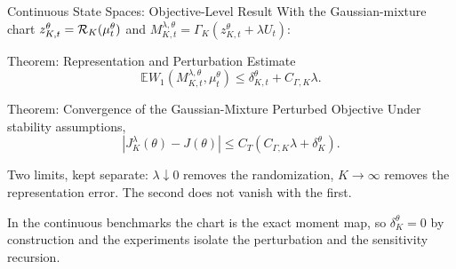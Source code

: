 \documentclass[9pt]{beamer}
\def\Rc{{\cal R}}
\def\E{{\mathbb E}}
\begin{document}
\begin{frame}{Continuous State Spaces: Objective-Level Result}
\small
With the Gaussian-mixture chart $z_{K,t}^\theta=\Rc_K(\mu_t^\theta)$ and $M_{K,t}^{\lambda,\theta}=\Gamma_K(z_{K,t}^\theta+\lambda U_t)$:

\vspace{0.2cm}
\begin{block}{Theorem: Representation and Perturbation Estimate}
\[
  \E W_1(M_{K,t}^{\lambda,\theta},\mu_t^\theta)
  \leq
  \delta_{K,t}^\theta+C_{\Gamma,K}\lambda .
\]
\end{block}

\begin{block}{Theorem: Convergence of the Gaussian-Mixture Perturbed Objective}
Under stability assumptions,
\[
  |J_K^\lambda(\theta)-J(\theta)|
  \leq C_T(C_{\Gamma,K}\lambda+\delta_K^\theta).
\]
\end{block}

\vspace{0.2cm}
Two limits, kept separate: $\lambda\downarrow0$ removes the randomization, $K\to\infty$ removes the representation error. The second does not vanish with the first.

\vspace{0.15cm}
In the continuous benchmarks the chart is the exact moment map, so $\delta_K^\theta=0$ by construction and the experiments isolate the perturbation and the sensitivity recursion.
\end{frame}
\end{document}
